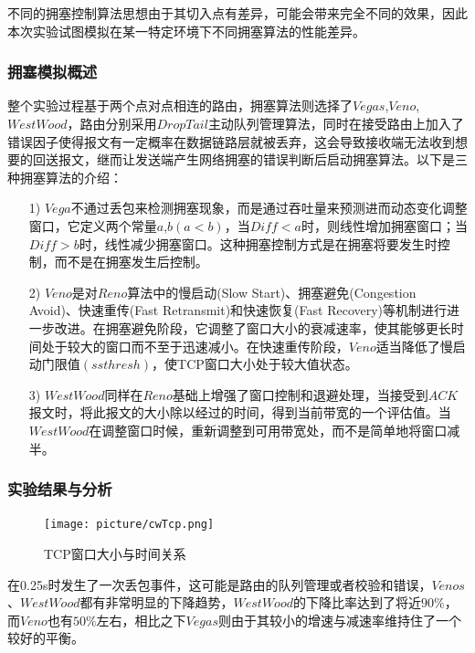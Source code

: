 \documentclass{article}
\begin{document}
不同的拥塞控制算法思想由于其切入点有差异，可能会带来完全不同的效果，因此本次实验试图模拟在某一特定环境下不同拥塞算法的性能差异。

\subsubsection{拥塞模拟概述}

整个实验过程基于两个点对点相连的路由，拥塞算法则选择了$Vegas$,$Veno$,$WestWood$，路由分别采用$DropTail$主动队列管理算法，同时在接受路由上加入了错误因子使得报文有一定概率在数据链路层就被丢弃，这会导致接收端无法收到想要的回送报文，继而让发送端产生网络拥塞的错误判断后启动拥塞算法。以下是三种拥塞算法的介绍：

\begin{itemize}
	\setlength{\itemsep}{0pt}
	\setlength{\parsep}{0pt}
	\setlength{\parskip}{0pt}
	\item [1)]$Vega$不通过丢包来检测拥塞现象，而是通过吞吐量来预测进而动态变化调整窗口，它定义两个常量$a$,$b$$(a<b)$，当$Diff< a$时，则线性增加拥塞窗口；当$Diff> b$时，线性减少拥塞窗口。这种拥塞控制方式是在拥塞将要发生时控制，而不是在拥塞发生后控制。
	\item [2)]$Veno$是对$Reno$算法中的慢启动(Slow Start)、拥塞避免(Congestion Avoid)、快速重传(Fast Retransmit)和快速恢复(Fast Recovery)等机制进行进一步改进。在拥塞避免阶段，它调整了窗口大小的衰减速率，使其能够更长时间处于较大的窗口而不至于迅速减小。在快速重传阶段，$Veno$适当降低了慢启动门限值$(ssthresh)$，使TCP窗口大小处于较大值状态。
	\item [3)]$WestWood$同样在$Reno$基础上增强了窗口控制和退避处理，当接受到$ACK$报文时，将此报文的大小除以经过的时间，得到当前带宽的一个评估值。当$WestWood$在调整窗口时候，重新调整到可用带宽处，而不是简单地将窗口减半。
\end{itemize}

\subsubsection{实验结果与分析}

\begin{figure}[H]
	\centering
	\texttt{[image: picture/cwTcp.png]}
	\caption{TCP窗口大小与时间关系}
	\label{fig:cWTCP}
\end{figure}

在0.25s时发生了一次丢包事件，这可能是路由的队列管理或者校验和错误，$Venos$、$WestWood$都有非常明显的下降趋势，$WestWood$的下降比率达到了将近$90\%$，而$Veno$也有$50\%$左右，相比之下$Vegas$则由于其较小的增速与减速率维持住了一个较好的平衡。
\end{document}

